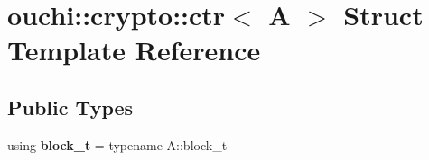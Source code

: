 \hypertarget{structouchi_1_1crypto_1_1ctr}{}\section{ouchi\+::crypto\+::ctr$<$ A $>$ Struct Template Reference}
\label{structouchi_1_1crypto_1_1ctr}
\subsection*{Public Types}
\begin{DoxyCompactItemize}
\item 
\mbox{\label{structouchi_1_1crypto_1_1ctr_aea07d8570563490cc6b613f19e6460db}} 
using {\bfseries block\+\_\+t} = typename A\+::block\+\_\+t
\end{DoxyCompactItemize}
